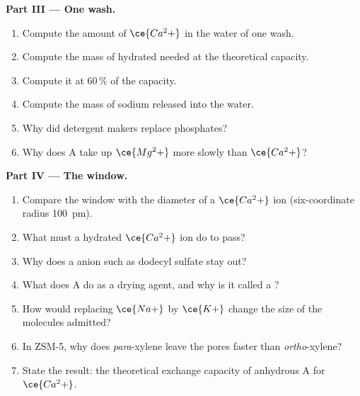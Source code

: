 \begin{problem}
\medskip\noindent\textbf{Part III --- One wash.}
\begin{enumerate}[resume]
  \item Compute the amount of $\ce{Ca^2+}$ in the water of one wash.
  \item Compute the mass of hydrated  needed at the theoretical capacity.
  \item Compute it at 60\,\% of the capacity.
  \item Compute the mass of sodium released into the water.
  \item Why did detergent makers replace phosphates?
  \item Why does  A take up $\ce{Mg^2+}$ more slowly than $\ce{Ca^2+}$?
\end{enumerate}

\medskip\noindent\textbf{Part IV --- The window.}
\begin{enumerate}[resume]
  \item Compare the window with the diameter of a $\ce{Ca^2+}$ ion (six-coordinate radius
        \qty{100}{pm}).
  \item What must a hydrated $\ce{Ca^2+}$ ion do to pass?
  \item Why does a  anion such as dodecyl sulfate stay out?
  \item What does  A do as a drying agent, and why is it called a
        ?
  \item How would replacing $\ce{Na+}$ by $\ce{K+}$ change the size of the molecules admitted?
  \item In ZSM-5, why does \textit{para}-xylene leave the pores faster than \textit{ortho}-xylene?
  \item State the result: the theoretical exchange capacity of anhydrous  A
        for $\ce{Ca^2+}$.
\end{enumerate}
\end{problem}
